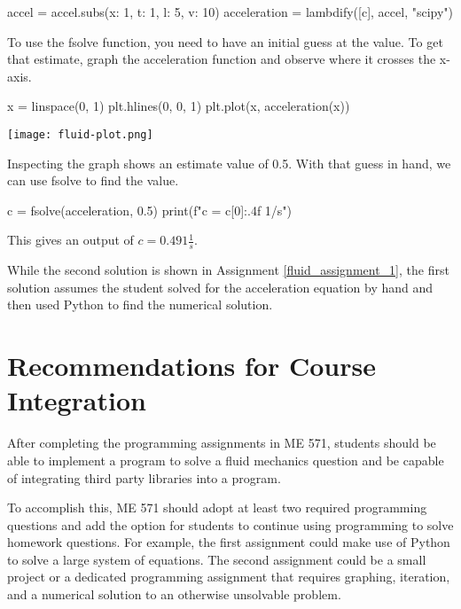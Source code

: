 \begin{tcolorbox}[breakable, enhanced jigsaw, title=ME 571: Assignment \ref{fluid_assignment_1}, 
    colframe=ksu-purple, colback=ksu-gray]
\begin{python}
accel = accel.subs({x: 1, t: 1, l: 5, v: 10})
acceleration = lambdify([c], accel, "scipy")
\end{python}

To use the fsolve function, you need to have an initial guess at the value. To get that
estimate, graph the acceleration function and observe where it crosses the x-axis.

\begin{python}
x = linspace(0, 1)
plt.hlines(0, 0, 1)
plt.plot(x, acceleration(x))
\end{python}

\begin{center}
    \texttt{[image: fluid-plot.png]}
\end{center}

Inspecting the graph shows an estimate value of 0.5. With that guess in hand, 
we can use fsolve to find the value.

\begin{python}
c = fsolve(acceleration, 0.5)
print(f"c = {c[0]:.4f} 1/s")
\end{python}

This gives an output of $ c = 0.491 \frac{1}{s} $.
\end{tcolorbox}

While the second solution is shown in Assignment \ref{fluid_assignment_1}, the first solution
assumes the student solved for the acceleration equation by hand and then used Python to
find the numerical solution.

\section{Recommendations for Course Integration}

After completing the programming assignments in ME 571, students should be able to implement a program to solve 
a fluid mechanics question and be capable of integrating third party libraries into a program. 

To accomplish this, ME 571 should adopt at least two required programming questions and add the option for 
students to continue using programming to solve homework questions. For example, the first assignment could
make use of Python to solve a large system of equations. The second assignment could be a small project or a dedicated
programming assignment that requires graphing, iteration, and a numerical solution to an otherwise unsolvable problem.

